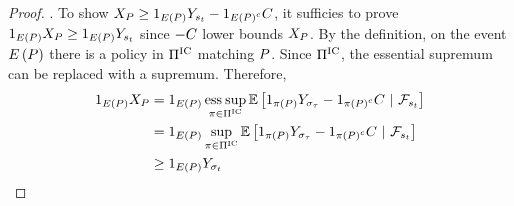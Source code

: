 \begin{proof}
        \EE\sbr{
            \snellenvss{
                \rbr{
                    \fixedpath,\nextexchange
                }
            }
            | 
            \statefiltss{\exchanget}
        }
    \).
    To show 
    \(
        X_{P}
        \geq
        1_{
            E\left(P\right)
        }
        Y_{
            s_{t}
        }
        -
        1_{
            E\left(P\right)^c
        }
        C
    \), 
    it sufficies to prove
    \(
        1_{
            E\left(P\right)
        }
        X_{P}
        \geq
        1_{
            E\left(P\right)
        }
        Y_{
            s_{t}
        }
    \) 
    since 
    $-C$ lower bounds $X_{P}$.
    By the definition, on the event
    $E\left(P\right)$ there is a policy in $\Pi^{\text{IC}}$ matching $P$.
    Since $\Pi^{\text{IC}}$, the essential supremum can be replaced with a supremum. Therefore,
    \begin{align*}
        1_{
            E\left(P\right)
        }
        X_{P}
        &=
        1_{
            E\left(P\right)
        }
        \operatorname*{ess\hspace{0.08cm}sup}_{
            \pi\in\Pi^{\text{IC}}
        }
        \mathbb{E}\left[
            1_{
                \pi\left(P\right)
            }
            Y_{
                \sigma_{\tau}
            }
            -
            1_{
                \pi\left(P\right)^c
            }
            C
            ~
            |
            ~
            \mathcal{F}_{s_{t}}
        \right]
        \\
        &=
        1_{
            E\left(P\right)
        }
        \sup_{
            \pi\in\Pi^{\text{IC}}
        }
        \mathbb{E}\left[
            1_{
                \pi\left(P\right)
            }
            Y_{
                \sigma_{\tau}
            }
            -
            1_{
                \pi\left(P\right)^c
            }
            C
            ~
            |
            ~
            \mathcal{F}_{s_{t}}
        \right]
        \\
        &\geq
        1_{
            E\left(P\right)
        }
        Y_{
            \sigma_{t}
}
\end{align*}
\end{proof}
